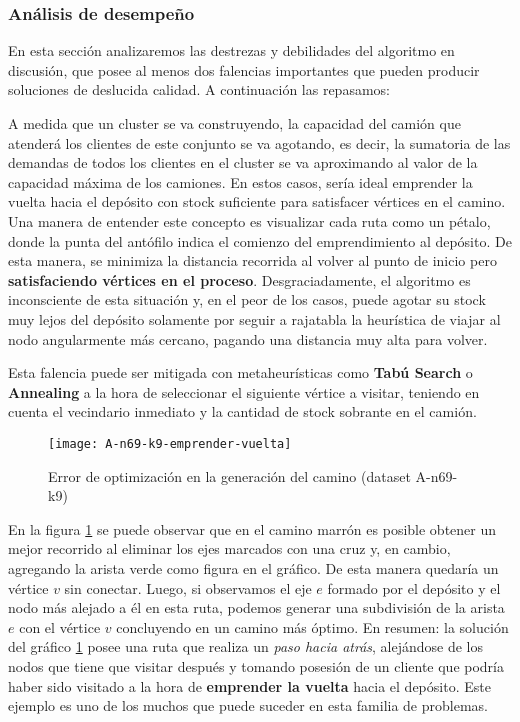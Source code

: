 \subsubsection{Análisis de desempeño}
En esta sección analizaremos las destrezas y debilidades del algoritmo en discusión, que posee al menos dos falencias importantes que pueden producir soluciones de deslucida calidad. A continuación las repasamos:

A medida que un cluster se va construyendo, la capacidad del camión que atenderá los clientes de este conjunto se va agotando, es decir, la sumatoria de las demandas de todos los clientes en el cluster se va aproximando al valor de la capacidad máxima de los camiones. En estos casos, sería ideal emprender la vuelta hacia el depósito con stock suficiente para satisfacer vértices en el camino. Una manera de entender este concepto es visualizar cada ruta como un pétalo, donde la punta del antófilo indica el comienzo del emprendimiento al depósito. De esta manera, se minimiza la distancia recorrida al volver al punto de inicio pero \textbf{satisfaciendo vértices en el proceso}. Desgraciadamente, el algoritmo es inconsciente de esta situación y, en el peor de los casos, puede agotar su stock muy lejos del depósito solamente por seguir a rajatabla la heurística de viajar al nodo angularmente más cercano, pagando una distancia muy alta para volver.

\vskip 8pt

Esta falencia puede ser mitigada con metaheurísticas como \textbf{Tabú Search} o \textbf{Annealing} a la hora de seleccionar el siguiente vértice a visitar, teniendo en cuenta el vecindario inmediato y la cantidad de stock sobrante en el camión.

\begin{figure}[H]
	\centering
	\texttt{[image: A-n69-k9-emprender-vuelta]}
	\caption{\footnotesize Error de optimización en la generación del camino (dataset A-n69-k9)}
	\label{fig:sweep-emprender-vuelta}
\end{figure}

En la figura \ref{fig:sweep-emprender-vuelta} se puede observar que en el camino marrón es posible obtener un mejor recorrido al eliminar los ejes marcados con una cruz y, en cambio, agregando la arista verde como figura en el gráfico. De esta manera quedaría un vértice $v$ sin conectar. Luego, si observamos el eje $e$ formado por el depósito y el nodo más alejado a él en esta ruta, podemos generar una subdivisión de la arista $e$ con el vértice $v$ concluyendo en un camino más óptimo. En resumen: la solución del gráfico \ref{fig:sweep-emprender-vuelta} posee una ruta que realiza un \textit{paso hacia atrás}, alejándose de los nodos que tiene que visitar después y tomando posesión de un cliente que podría haber sido visitado a la hora de \textbf{emprender la vuelta} hacia el depósito. Este ejemplo es uno de los muchos que puede suceder en esta familia de problemas.

